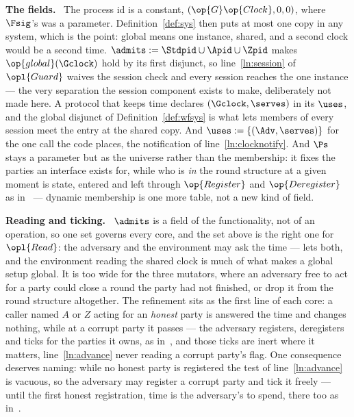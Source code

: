 \documentclass[10pt,oneside,openany]{book}
\newcommand{\heading}[1]{\medskip\par\noindent\textcolor{accent}{\textbf{#1.}}\ }
\theoremstyle{accentdef}
\theoremstyle{accentplain}
\begin{document}
\heading{The fields} The process id is a constant, $(\op{G}\op{Clock},0,0)$, where
$\Fsig$'s was a parameter. Definition~\ref{def:sys} then puts at most one copy in any system,
which is the point: global means one instance, shared, and a second clock would be a second time.
$\admits := \Stdpid \cup \Apid \cup \Zpid$ makes $\op{global}(\Gclock)$ hold by its first disjunct,
so line~\ref{ln:session} of $\opl{Guard}$ waives the session check and every session reaches the
one instance --- the very separation the session component exists to make, deliberately not made
here. A protocol that keeps time declares $(\Gclock,\serves)$ in its $\uses$, and the global
disjunct of Definition~\ref{def:wfsys} is what lets members of every session meet the entry at
the shared copy. And $\uses := \{(\Adv,\serves)\}$ for the one call the code places, the notification
of line~\ref{ln:clocknotify}. And $\Ps$ stays a parameter but as the universe rather than the
membership: it fixes the parties an interface exists for, while who is \emph{in} the round
structure at a given moment is state, entered and left through $\op{Register}$ and
$\op{Deregister}$ as in~\cite{BMTZ17} --- dynamic membership is one more table, not a new kind
of field.

\heading{Reading and ticking} $\admits$ is a field of the functionality, not of an operation, so
one set governs every core, and the set above is the right one for $\opl{Read}$: the adversary and
the environment may ask the time --- \cite{BMTZ17} lets both, and the environment reading the
shared clock is much of what makes a global setup global. It is too wide for the three mutators,
where an adversary free to act for a party could close a round the party had not finished, or
drop it from the round structure altogether. The refinement sits as the first line of each core:
a caller named $A$ or $Z$ acting for an \emph{honest} party is answered the time and changes
nothing, while at a corrupt party it passes --- the adversary registers, deregisters and ticks
for the parties it owns, as in~\cite{BMTZ17}, and those ticks are inert where it matters,
line~\ref{ln:advance} never reading a corrupt party's flag. One consequence deserves naming:
while no honest party is registered the test of line~\ref{ln:advance} is vacuous, so the
adversary may register a corrupt party and tick it freely --- until the first honest
registration, time is the adversary's to spend, there too as in~\cite{BMTZ17}.
\end{document}
